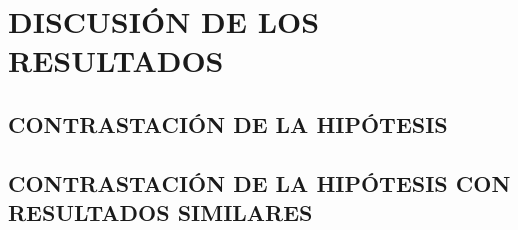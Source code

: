 \chapter{DISCUSIÓN DE LOS RESULTADOS}


\section{CONTRASTACIÓN DE LA HIPÓTESIS}

\lipsum[1]


\section{CONTRASTACIÓN DE LA HIPÓTESIS CON RESULTADOS SIMILARES}

\lipsum[2]
